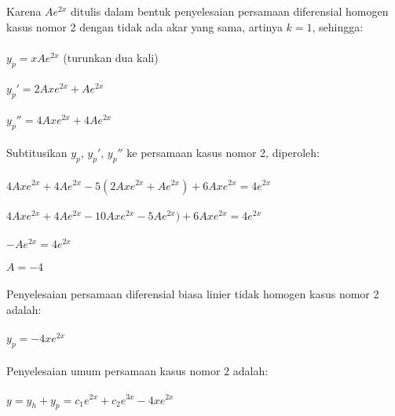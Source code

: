 \begin{enumerate}[1.]
	Karena \begin{math} Ae^{2x} \end{math} ditulis dalam bentuk penyelesaian persamaan diferensial homogen kasus nomor 2 dengan tidak ada akar yang sama, artinya \begin{math} k = 1 \end{math}, sehingga: \\ \\
	\begin{math} y_p = x Ae^{2x} \end{math} (turunkan dua kali) \\ \\
	\begin{math} y_p' = 2Axe^{2x} + Ae^{2x} \end{math} \\ \\
	\begin{math} y_p'' = 4Axe^{2x} + 4Ae^{2x} \end{math} \\ \\
	Subtitusikan \begin{math} y_p \end{math}, \begin{math} y_p' \end{math}, \begin{math} y_ p'' \end{math} ke persamaan kasus nomor 2, diperoleh: \\ \\
	\begin{math}  4Axe^{2x} + 4Ae^{2x} -5 (2Axe^{2x} + Ae^{2x}) + 6Axe^{2x} = 4e^{2x} \end{math} \\ \\
	\begin{math}  4Axe^{2x} + 4Ae^{2x} -10Axe^{2x} - 5Ae^{2x}) + 6Axe^{2x} = 4e^{2x} \end{math} \\ \\
	\begin{math} -Ae^{2x} = 4e^{2x} \end{math} \\ \\
	\begin{math} A = -4 \end{math} \\ \\
	Penyelesaian persamaan diferensial biasa linier tidak homogen kasus nomor 2 adalah: \\ \\
	\begin{math} y_p = -4xe^{2x} \end{math} \\ \\
	Penyelesaian umum persamaan kasus nomor 2 adalah: \\ \\
	\begin{math} y = y_h + y_p = c_1 e^{2x} + c_2 e^{3x} - 4xe^{2x} \end{math}


\end{enumerate}
